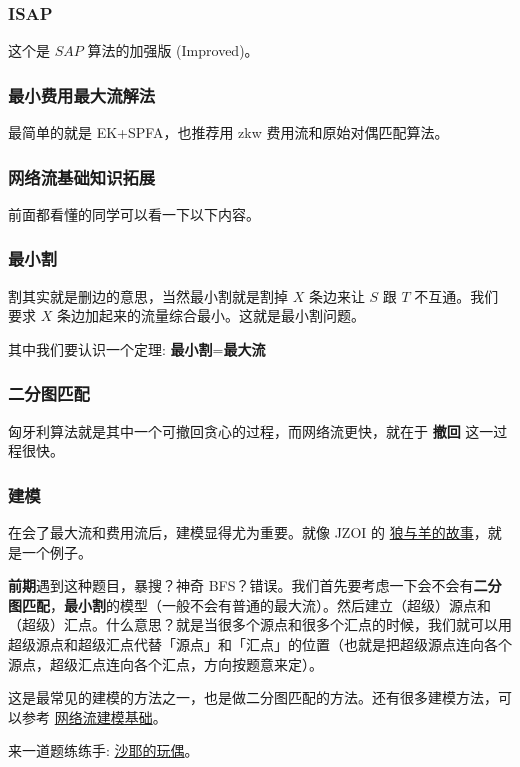\subsubsection{ISAP}

这个是 $SAP$ 算法的加强版 (Improved)。

\subsubsection{最小费用最大流解法}

最简单的就是 EK+SPFA，也推荐用 zkw 费用流和原始对偶匹配算法。

\subsubsection{网络流基础知识拓展}

前面都看懂的同学可以看一下以下内容。

\subsubsection{最小割}

割其实就是删边的意思，当然最小割就是割掉 $X$ 条边来让 $S$ 跟 $T$ 不互通。我们要求 $X$ 条边加起来的流量综合最小。这就是最小割问题。

其中我们要认识一个定理: \textbf{最小割}=\textbf{最大流}

\subsubsection{二分图匹配}

匈牙利算法就是其中一个可撤回贪心的过程，而网络流更快，就在于 \textbf{撤回} 这一过程很快。

\subsubsection{建模}

在会了最大流和费用流后，建模显得尤为重要。就像 JZOI 的 \href{https://www.luogu.org/problemnew/show/P2598}{狼与羊的故事}，就是一个例子。

\textbf{前期}遇到这种题目，暴搜？神奇 BFS？错误。我们首先要考虑一下会不会有\textbf{二分图匹配}，\textbf{最小割}的模型（一般不会有普通的最大流）。然后建立（超级）源点和（超级）汇点。什么意思？就是当很多个源点和很多个汇点的时候，我们就可以用超级源点和超级汇点代替「源点」和「汇点」的位置（也就是把超级源点连向各个源点，超级汇点连向各个汇点，方向按题意来定）。

这是最常见的建模的方法之一，也是做二分图匹配的方法。还有很多建模方法，可以参考 \href{https://www.cnblogs.com/victorique/p/8560656.html}{网络流建模基础}。

来一道题练练手: \href{https://www.luogu.org/paste/z3085b8l}{沙耶的玩偶}。
